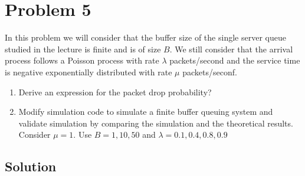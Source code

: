 
\section*{Problem 5}
In this problem we will consider that the buffer size of the single server queue studied in the lecture is finite and is of size $B$.
We still consider that the arrival process follows a Poisson process with rate $\lambda$ packets/second and the service time is negative exponentially distributed with rate $\mu$ packets/seconf.

\begin{enumerate}
    \item Derive an expression for the packet drop probability?
    \item Modify simulation code to simulate a finite buffer queuing system and validate simulation by comparing the simulation and the theoretical results. Consider $\mu = 1$. Use $B = 1, 10, 50$ and $\lambda = 0.1, 0.4, 0.8, 0.9$
\end{enumerate}

\subsection*{Solution}
